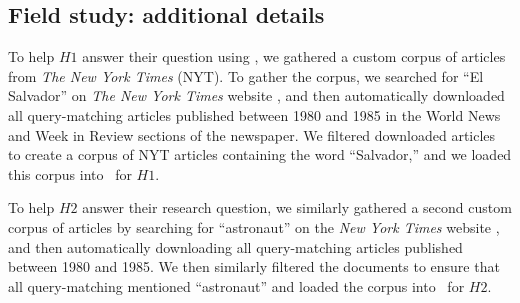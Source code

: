 \subsection*{Field study: additional details}

To help $H1$ answer their question using \ours, we gathered a custom corpus of articles from \textit{The New York Times} (NYT). To gather the corpus, we searched for ``El Salvador'' on \textit{The New York Times} website \cite{nytwebsite}, and then automatically downloaded all query-matching articles published between 1980 and 1985 in the World News and Week in Review sections of the newspaper. 
We filtered downloaded articles to create a corpus of NYT articles containing the word ``Salvador,'' and we loaded this corpus into \ours~for $H1$. 

To help $H2$ answer their research question, we similarly gathered a second custom corpus of articles by searching for ``astronaut'' on the \textit{New York Times} website \cite{nytwebsite}, and then automatically downloading all query-matching articles published between 1980 and 1985. We then similarly filtered the documents to ensure that all query-matching mentioned ``astronaut'' and loaded the corpus into \ours~for $H2$.